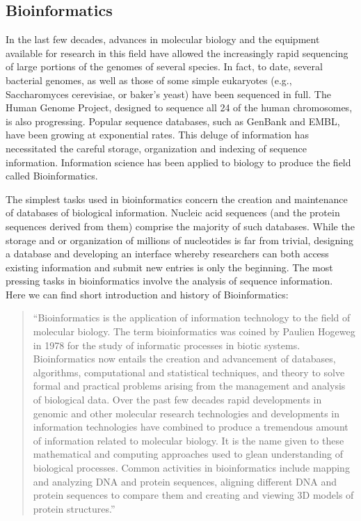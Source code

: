 \subsection{Bioinformatics}
\label{sec:bioinformatics}

In the last few decades, advances in molecular biology and the equipment available for research in this field have allowed the increasingly rapid sequencing of large portions of the genomes of several species.
In fact, to date, several bacterial genomes, as well as those of some simple eukaryotes (e.g., Saccharomyces cerevisiae, or baker's yeast) have been sequenced in full.
The Human Genome Project, designed to sequence all 24 of the human chromosomes, is also progressing. Popular sequence databases, such as GenBank and EMBL, have been growing at exponential rates.
This deluge of information has necessitated the careful storage, organization and indexing of sequence information. Information science has been applied to biology to produce the field called Bioinformatics.


The simplest tasks used in bioinformatics concern the creation and maintenance of databases of biological information.
Nucleic acid sequences (and the protein sequences derived from them) comprise the majority of such databases. While the storage and or organization of millions of nucleotides is far from trivial,
designing a database and developing an interface whereby researchers can both access existing information and submit new entries is only the beginning.
The most pressing tasks in bioinformatics involve the analysis of sequence information.~\cite{Biology}
Here we can find short introduction and history of Bioinformatics:

\begin{quotation}
``Bioinformatics is the application of information technology to the field of molecular biology.
The term bioinformatics was coined by Paulien Hogeweg in 1978 for the study of informatic processes in biotic systems.
Bioinformatics now entails the creation and advancement of databases, algorithms, computational and statistical techniques, and theory to solve formal and practical problems arising from the management and analysis of biological data.
Over the past few decades rapid developments in genomic and other molecular research technologies and developments in information technologies have combined to produce a tremendous amount of information related to molecular biology.
It is the name given to these mathematical and computing approaches used to glean understanding of biological processes.
Common activities in bioinformatics include mapping and analyzing DNA and protein sequences, aligning different DNA and protein sequences to compare them and creating and viewing 3D models of protein structures.''~\cite{Bioinformatic}
\end{quotation}

